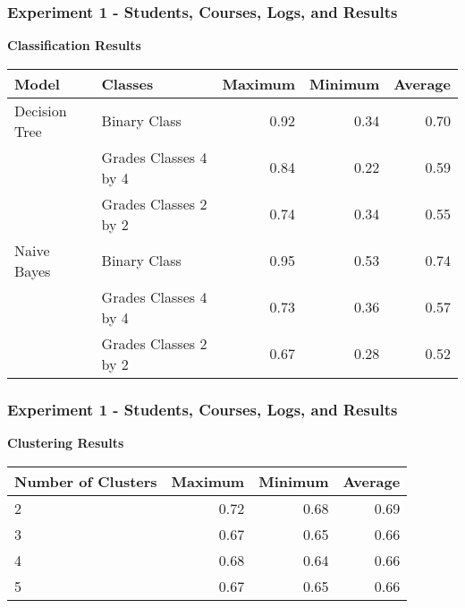 \begin{frame}
\frametitle{Experiment 1 - Students, Courses, Logs, and Results}

\textbf{Classification Results}

\vspace{0.5cm}

{

\small
\centering

\begin{tabular}{| l | l | r | r | r |}

    \hline
    \textbf{Model} & \textbf{Classes} & \textbf{Maximum} & \textbf{Minimum} & \textbf{Average} \\ \hline
    Decision Tree & Binary Class          & 0.92 & 0.34 & 0.70 \\
                  & Grades Classes 4 by 4 & 0.84 & 0.22 & 0.59 \\
                  & Grades Classes 2 by 2 & 0.74 & 0.34 & 0.55 \\ \hline
    Naive Bayes   & Binary Class          & 0.95 & 0.53 & 0.74 \\
                  & Grades Classes 4 by 4 & 0.73 & 0.36 & 0.57 \\
                  & Grades Classes 2 by 2 & 0.67 & 0.28 & 0.52 \\ \hline
\end{tabular}

}

\end{frame}

\begin{frame}
\frametitle{Experiment 1 - Students, Courses, Logs, and Results}

\textbf{Clustering Results}

\vspace{0.5cm}

{

\small
\centering

\begin{tabular}{| l | r | r | r |}
    \hline
    \textbf{Number of Clusters} & \textbf{Maximum} & \textbf{Minimum} & \textbf{Average} \\ \hline
    2 & 0.72 & 0.68 & 0.69 \\ \hline
    3 & 0.67 & 0.65 & 0.66 \\ \hline
    4 & 0.68 & 0.64 & 0.66 \\ \hline
    5 & 0.67 & 0.65 & 0.66 \\ \hline
\end{tabular}

}

\end{frame}

